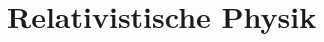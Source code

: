 %

\begingroup
\let\cleardoublepage\relax
\chapter[Relativistische Physik]{Relativistische Physik}\label{chap:srt}
\def\chapname{srt}



\clearpage


\renewcommand\glslongextraNameAlign{p{36mm}}
\renewcommand\glslongextraDescAlign{p{60mm}}
\clearpage
\bgroup
\small
\printunsrtglossary[type=srt]
\egroup
\clearpage


%

